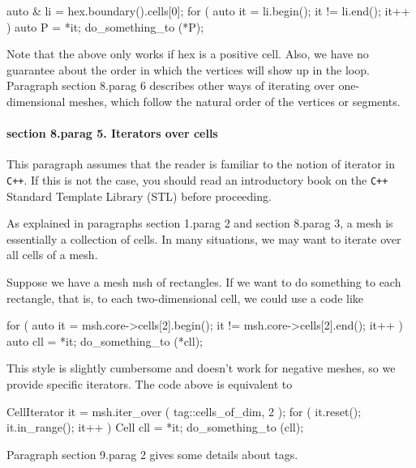 \verbatim
   auto & li = hex.boundary().cells[0];
   for ( auto it = li.begin(); it != li.end(); it++ )
   { auto P = *it;  do_something_to (*P);  }
\endverbatim

Note that the above only works if {\codett hex} is a positive cell.
Also, we have no guarantee about the order in which the vertices will show up in the loop.
Paragraph \numb section 8.\numb parag 6 describes other ways of iterating over one-dimensional
meshes, which follow the natural order of the vertices or segments.


\paragraph{\numb section 8.\numb parag 5. Iterators over cells}

This paragraph assumes that the reader is familiar to the notion of iterator in {\tt C++}.
If this is not the case, you should read an introductory book on the {\tt C++}
Standard Template Library (STL) before proceeding.

As explained in paragraphs \numb section 1.\numb parag 2 and \numb section 8.\numb parag 3,
a mesh is essentially a collection of cells.
In many situations, we may want to iterate over all cells of a mesh.

Suppose we have a mesh {\codett msh} of rectangles.
If we want to do something to each rectangle, that is, to each two-dimensional cell,
we could use a code like

\verbatim
   for ( auto it = msh.core->cells[2].begin();
              it != msh.core->cells[2].end(); it++ )
   {  auto cll = *it;  do_something_to (*cll);  }
\endverbatim

This style is slightly cumbersome and doesn't work for negative meshes,
so we provide specific iterators.
The code above is equivalent to

\verbatim
   CellIterator it = msh.iter_over ( tag::cells_of_dim, 2 );
   for ( it.reset(); it.in_range(); it++ )
   {  Cell cll = *it;  do_something_to (cll);  }
\endverbatim

Paragraph \numb section 9.\numb parag 2 gives some details about tags.

